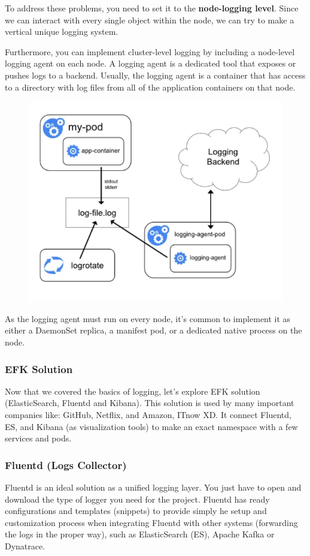 \documentclass{article}
\begin{document}
To address these problems, you need to set it to the \textbf{node-logging level}. Since we can interact with every single object within the node, we can try to make a vertical unique logging system. 

Furthermore, you can implement cluster-level logging by including a node-level logging agent on each node. A logging agent is a dedicated tool that exposes or pushes logs to a backend. Usually, the logging agent is a container that has access to a directory with log files from all of the application containers on that node.

\begin{figure}[H]
    \includegraphics[width=\textwidth]{pictures/loggingsol.png}
\end{figure}

As the logging agent must run on every node, it's common to implement it as either a DaemonSet replica, a manifest pod, or a dedicated native process on the node.

\subsubsection{EFK Solution}

Now that we covered the basics of logging, let's explore EFK solution (ElasticSearch, Fluentd and Kibana). This solution is used by many important companies like: GitHub, Netflix, and Amazon, ITnow XD. It connect Fluentd, ES, and Kibana (as visualization tools) to make an exact namespace with a few services and pods.

\subsubsection{Fluentd (Logs Collector)}
Fluentd is an ideal solution as a unified logging layer. You just have to open and download the type of logger you need for the project.
Fluentd has ready configurations and templates (snippets) to provide simply he setup and customization process when integrating Fluentd with other systems (forwarding the logs in the proper way), such as ElasticSearch (ES), Apache Kafka or Dynatrace.
\end{document}
